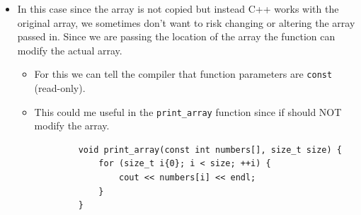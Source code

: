 \begin{itemize}
    \item In this case since the array is not copied but instead C++ works with the original array, we sometimes don't want to risk changing or altering the array passed in. Since we are passing the location of the array the function can modify the actual array.
        \begin{itemize}
            \item For this we can tell the compiler that function parameters are \texttt{const} (read-only).
            \item This could me useful in the \texttt{print_array} function since if should NOT modify the array.
        \end{itemize}
        \begin{verbatim}
            void print_array(const int numbers[], size_t size) {
                for (size_t i{0}; i < size; ++i) {
                    cout << numbers[i] << endl;
                }
            }
        \end{verbatim}
\end{itemize}


